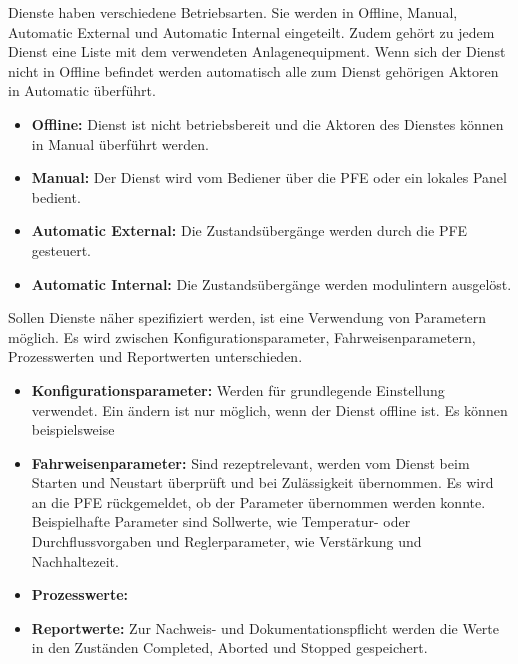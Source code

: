 Dienste haben verschiedene Betriebsarten. Sie werden in Offline, Manual, Automatic External und Automatic Internal eingeteilt. Zudem gehört zu jedem Dienst eine Liste mit dem verwendeten Anlagenequipment. Wenn sich der Dienst nicht in Offline befindet werden automatisch alle zum Dienst gehörigen Aktoren in Automatic überführt.
\begin{itemize}
\item \textbf{Offline:} Dienst ist nicht betriebsbereit und die Aktoren des Dienstes können in Manual überführt werden.
\item \textbf{Manual:} Der Dienst wird vom Bediener über die PFE oder ein lokales Panel bedient.
\item \textbf{Automatic External:} Die Zustandsübergänge werden durch die PFE gesteuert.
\item \textbf{Automatic Internal:} Die Zustandsübergänge werden modulintern ausgelöst.
\end{itemize}

Sollen Dienste näher spezifiziert werden, ist eine Verwendung von Parametern möglich. Es wird zwischen Konfigurationsparameter, Fahrweisenparametern, Prozesswerten und Reportwerten unterschieden.
\begin{itemize}
\item \textbf{Konfigurationsparameter:} Werden für grundlegende Einstellung verwendet. Ein ändern ist nur möglich, wenn der Dienst offline ist. Es können beispielsweise 
\item \textbf{Fahrweisenparameter:} Sind rezeptrelevant, werden vom Dienst beim Starten und Neustart überprüft und bei Zulässigkeit übernommen. Es wird an die PFE rückgemeldet, ob der Parameter übernommen werden konnte. Beispielhafte Parameter sind Sollwerte, wie Temperatur- oder Durchflussvorgaben und Reglerparameter, wie Verstärkung und Nachhaltezeit.
\item \textbf{Prozesswerte:} 
\item \textbf{Reportwerte:} Zur Nachweis- und Dokumentationspflicht werden die Werte in den Zuständen Completed, Aborted und Stopped gespeichert.
\end{itemize}

